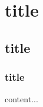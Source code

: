 \documentclass{report}
\begin{document}
	\chapter{title}
	\section{title}
	\begin{figure}
		\centering
	\end{figure}
	\subsection{title}
	\begin{description}
		content...
	\end{description}
\end{document}
